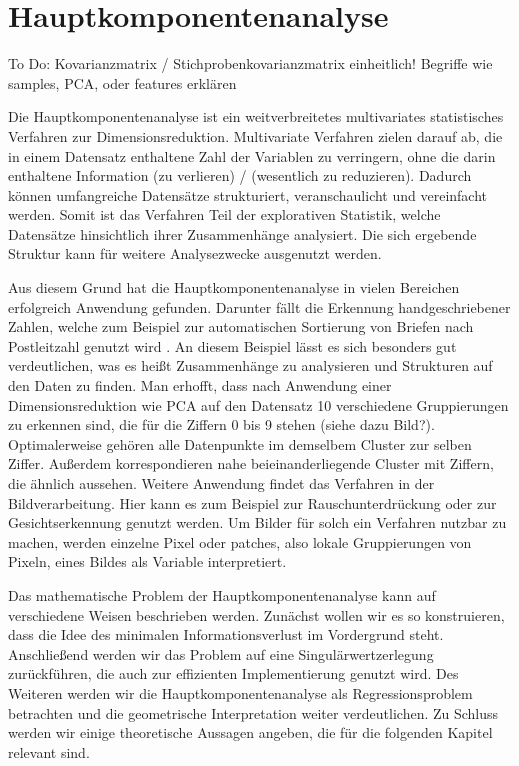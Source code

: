 \chapter{Hauptkomponentenanalyse}

\label{pca}

To Do: Kovarianzmatrix / Stichprobenkovarianzmatrix einheitlich!
Begriffe wie samples, PCA, oder features erklären

Die Hauptkomponentenanalyse ist ein weitverbreitetes multivariates statistisches Verfahren zur Dimensionsreduktion. Multivariate Verfahren zielen darauf ab, die in einem Datensatz enthaltene Zahl der Variablen zu verringern, ohne die darin enthaltene Information (zu verlieren) / (wesentlich zu reduzieren). Dadurch können umfangreiche Datensätze strukturiert, veranschaulicht und vereinfacht werden. Somit ist das Verfahren Teil der explorativen Statistik, welche Datensätze hinsichtlich ihrer Zusammenhänge analysiert. Die sich ergebende Struktur kann für weitere Analysezwecke ausgenutzt werden.

Aus diesem Grund hat die Hauptkomponentenanalyse in vielen Bereichen erfolgreich Anwendung gefunden. Darunter fällt die Erkennung handgeschriebener Zahlen, welche zum Beispiel zur automatischen Sortierung von Briefen nach Postleitzahl genutzt wird \cite{hastie_elements}. An diesem Beispiel lässt es sich besonders gut verdeutlichen, was es heißt Zusammenhänge zu analysieren und Strukturen auf den Daten zu finden. Man erhofft, dass nach Anwendung einer Dimensionsreduktion wie PCA auf den Datensatz 10 verschiedene Gruppierungen zu erkennen sind, die für die Ziffern 0 bis 9 stehen (siehe dazu Bild?). Optimalerweise gehören alle Datenpunkte im demselbem Cluster zur selben Ziffer. Außerdem korrespondieren nahe beieinanderliegende Cluster mit Ziffern, die ähnlich aussehen. Weitere Anwendung findet das Verfahren in der Bildverarbeitung. Hier kann es zum Beispiel zur Rauschunterdrückung \cite{babu} oder zur Gesichtserkennung \cite{jiang} genutzt werden. Um Bilder für solch ein Verfahren nutzbar zu machen, werden einzelne Pixel oder patches, also lokale Gruppierungen von Pixeln, eines Bildes als Variable interpretiert.

Das mathematische Problem der Hauptkomponentenanalyse kann auf verschiedene Weisen beschrieben werden. Zunächst wollen wir es so konstruieren, dass die Idee des minimalen Informationsverlust im Vordergrund steht. Anschließend werden wir das Problem auf eine Singulärwertzerlegung zurückführen, die auch zur effizienten Implementierung genutzt wird. Des Weiteren werden wir die Hauptkomponentenanalyse als Regressionsproblem betrachten und die geometrische Interpretation weiter verdeutlichen. Zu Schluss werden wir einige theoretische Aussagen angeben, die für die folgenden Kapitel relevant sind.


